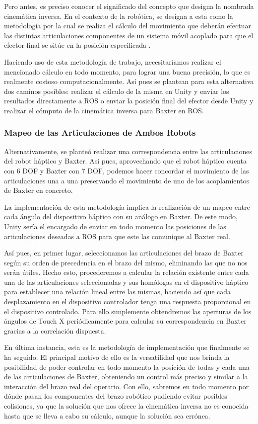 Pero antes, es preciso conocer el significado del concepto que designa la nombrada cinemática inversa. En el contexto de la robótica, se designa a esta como la metodología por la cual se realiza el cálculo del movimiento que deberán efectuar las distintas articulaciones componentes de un sistema móvil acoplado para que el efector final se sitúe en la posición especificada \cite{69,70}.

Haciendo uso de esta metodología de trabajo, necesitaríamos realizar el mencionado cálculo en todo momento, para lograr una buena precisión, lo que es realmente costoso computacionalmente. Así pues se plantean para esta alternativa dos caminos posibles: realizar el cálculo de la misma en Unity y enviar los resultados directamente a ROS o enviar la posición final del efector desde Unity y realizar el cómputo de la cinemática inversa para Baxter en ROS. 

\subsubsection{Mapeo de las Articulaciones de Ambos Robots}
Alternativamente, se planteó realizar una correspondencia entre las articulaciones del robot háptico y Baxter. Así pues, aprovechando que el robot háptico cuenta con 6 DOF y Baxter con 7 DOF, podemos hacer concordar el movimiento de las articulaciones una a una preservando el movimiento de uno de los acoplamientos de Baxter en concreto. 

La implementación de esta metodología implica la realización de un mapeo entre cada ángulo del dispositivo háptico con su análogo en Baxter. De este modo, Unity sería el encargado de enviar en todo momento las posiciones de las articulaciones deseadas a ROS para que este las comunique al Baxter real.

Así pues, en primer lugar, seleccionamos las articulaciones del brazo de Baxter según su orden de precedencia en el brazo del mismo, eliminando las que no nos serán útiles. Hecho esto, procederemos a calcular la relación existente entre cada una de las articulaciones seleccionadas y sus homólogas en el dispositivo háptico para establecer una relación lineal entre las mismas, haciendo así que cada desplazamiento en el dispositivo controlador tenga una respuesta proporcional en el dispositivo controlado. Para ello simplemente obtendremos las aperturas de los ángulos de Touch X periódicamente para calcular su correspondencia en Baxter gracias a la correlación dispuesta.

En última instancia, esta es la metodología de implementación que finalmente se ha seguido. El principal motivo de ello es la versatilidad que nos brinda la posibilidad de poder controlar en todo momento la posición de todas y cada una de las articulaciones de Baxter, obteniendo un control más preciso y similar a la interacción del brazo real del operario. Con ello, sabremos en todo momento por dónde pasan los componentes del brazo robótico pudiendo evitar posibles colisiones, ya que la solución que nos ofrece la cinemática inversa no es conocida hasta que se lleva a cabo su cálculo, aunque la solución sea errónea.

